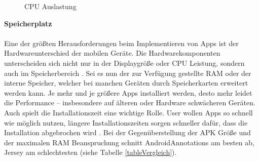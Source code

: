 \begin{figure} [ht]
	\centering
	 \qquad
	 \qquad
	 \qquad
	\caption{CPU Auslastung} 
	\label{cpuAuslastung}
\end{figure} 

{\large \textbf{Speicherplatz}}\\\\
Eine der größten Herausforderungen beim Implementieren von Apps ist der Hardwareunterschied der mobilen Geräte. Die Hardwarekomponenten unterscheiden sich nicht nur in der Displaygröße oder CPU Leistung, sondern auch im Speicherbereich \cite{joorabchi:challenges}. Sei es nun der zur Verfügung gestellte \acrfull{RAM} oder der interne Speicher, welcher bei manchen Geräten durch Speicherkarten erweitert werden kann. Je mehr und je größere Apps installiert werden, desto mehr leidet die Performance – insbesondere auf älteren oder Hardware schwächeren Geräten. Auch spielt die Installationszeit eine wichtige Rolle. User wollen Apps so schnell wie möglich nutzen, längere Installationszeiten sorgen schneller dafür, dass die Installation abgebrochen wird \cite{schaefers:apk}. Bei der Gegenüberstellung der APK Größe und der maximalen RAM Beanspruchung schnitt AndroidAnnotations am besten ab, Jersey am schlechtesten (siehe Tabelle \ref{tableVergleich}). 

